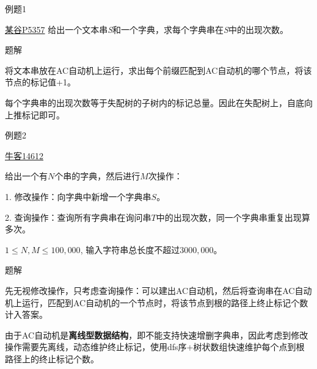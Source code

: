 \documentclass{ctexbeamer}		%
\begin{document}
\begin{frame}{例题1}
    
\begin{block}{\href{https://www.luogu.com.cn/problem/P5357}{某谷P5357}}
给出一个文本串\textit{S}和一个字典，求每个字典串在\textit{S}中的出现次数。

\end{block}

\pause

\begin{block}{题解}

将文本串放在AC自动机上运行，求出每个前缀匹配到AC自动机的哪个节点，将该节点的标记值+1。

\pause

每个字典串的出现次数等于失配树的子树内的标记总量。因此在失配树上，自底向上推标记即可。

\end{block}

\end{frame}

\begin{frame}{例题2}

\begin{block}{\href{https://ac.nowcoder.com/acm/problem/14612}{牛客14612}}

给出一个有$N$个串的字典，然后进行$M$次操作：

1. 修改操作：向字典中新增一个字典串$S$。

2. 查询操作：查询所有字典串在询问串$T$中的出现次数，同一个字典串重复出现算多次。

$1 \leq N,M \leq 100,000$, 输入字符串总长度不超过$3000, 000$。

\end{block}

\pause

\begin{block}{题解}

先无视修改操作，只考虑查询操作：可以建出AC自动机，然后将查询串在AC自动机上运行，匹配到AC自动机的一个节点时，将该节点到根的路径上终止标记个数计入答案。

\pause

由于AC自动机是\textbf{离线型数据结构}，即不能支持快速增删字典串，因此考虑到修改操作需要先离线，动态维护终止标记，使用dfs序+树状数组快速维护每个点到根路径上的终止标记个数。

\end{block}

\end{frame}
\end{document}
